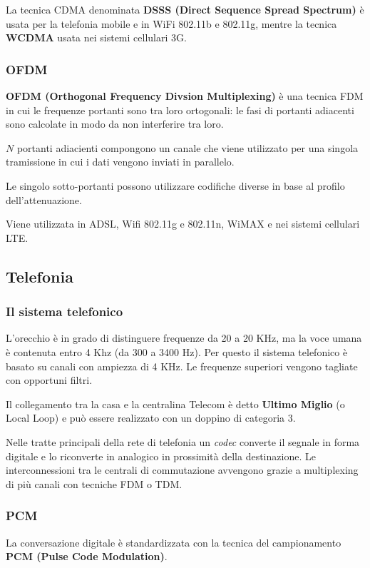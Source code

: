            La tecnica CDMA denominata \textbf{DSSS (Direct Sequence Spread Spectrum)} è usata per la telefonia mobile e in WiFi 802.11b e 802.11g, mentre la tecnica \textbf{WCDMA} usata nei sistemi cellulari 3G.

        \subsubsection{OFDM}
            \textbf{OFDM (Orthogonal Frequency Divsion Multiplexing)} è una tecnica FDM in cui le frequenze portanti sono tra loro ortogonali: le fasi di portanti adiacenti sono calcolate in modo da non interferire tra loro.

            $N$ portanti adiacienti compongono un canale che viene utilizzato per una singola tramissione in cui i dati vengono inviati in parallelo.

            Le singolo sotto-portanti possono utilizzare codifiche diverse in base al profilo dell'attenuazione.

            Viene utilizzata in ADSL, Wifi 802.11g e 802.11n, WiMAX e nei sistemi cellulari LTE.

    \subsection{Telefonia}
        \subsubsection{Il sistema telefonico}
            L'orecchio è in grado di distinguere frequenze da 20 a 20 KHz, ma la voce umana è contenuta entro 4 Khz (da 300 a 3400 Hz). Per questo il sistema telefonico è basato su canali con ampiezza di 4 KHz. Le frequenze superiori vengono tagliate con opportuni filtri.
        
            Il collegamento tra la casa e la centralina Telecom è detto \textbf{Ultimo Miglio} (o Local Loop) e può essere realizzato con un doppino di categoria 3.
        
            Nelle tratte principali della rete di telefonia un \textit{codec} converte il segnale in forma digitale e lo riconverte in analogico in prossimità della destinazione. Le interconnessioni tra le centrali di commutazione avvengono grazie a multiplexing di più canali con tecniche FDM o TDM.

        \subsubsection{PCM}
            La conversazione digitale è standardizzata con la tecnica del campionamento \textbf{PCM (Pulse Code Modulation)}.


